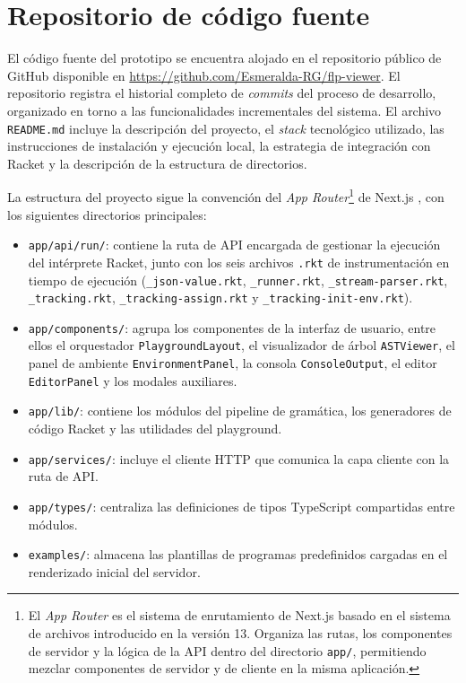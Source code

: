 \section{Repositorio de código fuente}

El código fuente del prototipo se encuentra alojado en el repositorio público de GitHub disponible en \url{https://github.com/Esmeralda-RG/flp-viewer}. El repositorio registra el historial completo de \textit{commits} del proceso de desarrollo, organizado en torno a las funcionalidades incrementales del sistema. El archivo \texttt{README.md} incluye la descripción del proyecto, el \textit{stack} tecnológico utilizado, las instrucciones de instalación y ejecución local, la estrategia de integración con Racket y la descripción de la estructura de directorios.

La estructura del proyecto sigue la convención del \textit{App Router}\footnote{El \textit{App Router} es el sistema de enrutamiento de Next.js basado en el sistema de archivos introducido en la versión 13. Organiza las rutas, los componentes de servidor y la lógica de la API dentro del directorio \texttt{app/}, permitiendo mezclar componentes de servidor y de cliente en la misma aplicación.} de Next.js \cite{nextjs}, con los siguientes directorios principales:

\begin{itemize}
  \item \texttt{app/\allowbreak api/\allowbreak run/}: contiene la ruta de API encargada de gestionar la ejecución del intérprete Racket, junto con los seis archivos \texttt{.rkt} de instrumentación en tiempo de ejecución (\texttt{\_json-value.rkt}, \texttt{\_runner.rkt}, \texttt{\_stream-parser.rkt}, \texttt{\_tracking.rkt}, \texttt{\_tracking-assign.rkt} y \texttt{\_tracking-init-env.rkt}).
  \item \texttt{app/\allowbreak components/}: agrupa los componentes de la interfaz de usuario, entre ellos el orquestador \texttt{Playground\allowbreak Layout}, el visualizador de árbol \texttt{AST\allowbreak Viewer}, el panel de ambiente \texttt{Environment\allowbreak Panel}, la consola \texttt{Console\allowbreak Output}, el editor \texttt{Editor\allowbreak Panel} y los modales auxiliares.
  \item \texttt{app/\allowbreak lib/}: contiene los módulos del pipeline de gramática, los generadores de código Racket y las utilidades del playground.
  \item \texttt{app/\allowbreak services/}: incluye el cliente HTTP que comunica la capa cliente con la ruta de API.
  \item \texttt{app/\allowbreak types/}: centraliza las definiciones de tipos TypeScript compartidas entre módulos.
  \item \texttt{examples/}: almacena las plantillas de programas predefinidos cargadas en el renderizado inicial del servidor.
\end{itemize}

